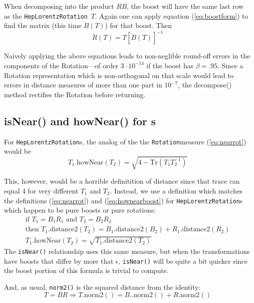 \documentclass[twoside,12pt]{article}
\def \Rotation {{\tt Rotation}}
\def \LT {{\tt HepLorentzRotation}}
\begin{document}
When decomposing into the product $ R B $, the boost
will have the same last row as the \LT\ $T$.  Again
one can apply equation (\ref{eq:boostform}) to
find the matrix (this time $\grave{B}(T)$) for that boost.  Then
\begin{equation}
\label{eq:decomRB}
  \acute{R}(T) = T \left[ \grave{B}(T) \right] ^{-1}
\end{equation}

Naively applying the above equations leads to non-neglible round-off errors 
in the components of the Rotation---of order $3 \cdot 10^{-14}$ if the
boost has $\beta = .95$.
Since a Rotation representation which is non-orthogonal on that scale would 
lead to errors in distance measures of more than one part in $10^{-7}$,
the decompose() method rectifies the Rotation before returning.

\subsection{isNear() and howNear() for \protect\LT s}

For \LT s, the analog of the the \Rotation measure (\ref{eq:nearrot}) would be
\[
  T_1 \mbox{.howNear}(T_2) = \sqrt{ 4 - \mbox{Tr}(T_1 T_2^{-1}) }
\]

This, however, would be a horrible definitition of distance since that trace
can equal 4 for very different $T_1$ and $T_2$.  Instead, we use a definition
which matches the definitions (\ref{eq:nearrot}) and (\ref{eq:hownearboost})
for \LT s which happen to be pure boosts or pure rotations:
\begin{eqnarray}
\label{eq:isnearLT}
\mbox{if } T_1 = B_1 R_1 \mbox{ and } T_2 = B_2 R_2 \nonumber \\
\mbox{then } T_1\mbox{.distance2}(T_2) = 
	B_1\mbox{.distance2}(B_2) + R_1\mbox{.distance2}(R_2)
	\\
\nonumber
T_1\mbox{.howNear}(T_2) = \sqrt {T_1\mbox{.distance2}(T_2)}
\end{eqnarray}
\noindent
The {\tt isNear()} relationship uses this same measure, but when the
transformations have boosts that differ by more that $\epsilon$, {\tt isNear()}
will be quite a bit quicker since the boost portion of this formula is trivial
to compute.

And, as usual, {\tt norm2()} is the squared distance from the identity:
\begin{equation}
\label{eq:ltnorm2}
T = B R \Longrightarrow T\mbox{.norm2}() = 
	B.\mbox{.norm2}() + R\mbox{.norm2}()
\end{equation}
\end{document}
